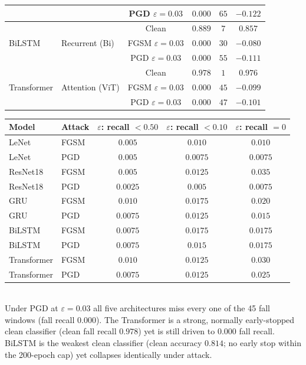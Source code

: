 \begin{table}[t]
\begin{tabular}{l l c c c c}
    & & PGD $\varepsilon{=}0.03$  & $0.000$ & $65$ & $-0.122$ \\
    \midrule
    \multirow{3}{*}{BiLSTM} & \multirow{3}{*}{Recurrent (Bi)}
      & Clean              & $0.889$ & $7$  & $0.857$ \\
    & & FGSM $\varepsilon{=}0.03$ & $0.000$ & $30$ & $-0.080$ \\
    & & PGD $\varepsilon{=}0.03$  & $0.000$ & $55$ & $-0.111$ \\
    \midrule
    \multirow{3}{*}{Transformer} & \multirow{3}{*}{Attention (ViT)}
      & Clean              & $0.978$ & $1$  & $0.976$ \\
    & & FGSM $\varepsilon{=}0.03$ & $0.000$ & $45$ & $-0.099$ \\
    & & PGD $\varepsilon{=}0.03$  & $0.000$ & $47$ & $-0.101$ \\
    \bottomrule
  \end{tabular}

  \vspace{0.6em}

  \begin{tabular}{l l c c c}
    \toprule
    Model & Attack & $\varepsilon$: recall $<0.50$ & $\varepsilon$: recall $<0.10$ & $\varepsilon$: recall $=0$ \\
    \midrule
    LeNet    & FGSM & $0.005$  & $0.010$  & $0.010$ \\
    LeNet    & PGD  & $0.005$  & $0.0075$ & $0.0075$ \\
    ResNet18 & FGSM & $0.005$  & $0.0125$ & $0.035$ \\
    ResNet18 & PGD  & $0.0025$ & $0.005$  & $0.0075$ \\
    GRU      & FGSM & $0.010$  & $0.0175$ & $0.020$ \\
    GRU      & PGD  & $0.0075$ & $0.0125$ & $0.015$ \\
    BiLSTM   & FGSM & $0.0075$ & $0.0175$ & $0.0175$ \\
    BiLSTM   & PGD  & $0.0075$ & $0.015$  & $0.0175$ \\
    Transformer & FGSM & $0.010$  & $0.0125$ & $0.030$ \\
    Transformer & PGD  & $0.0075$ & $0.0125$ & $0.025$ \\
    \bottomrule
  \end{tabular}
  \\[0.3em]
  {\footnotesize Under PGD at $\varepsilon=0.03$ all five architectures miss every
  one of the 45 fall windows (fall recall $0.000$). The Transformer is a strong,
  normally early-stopped clean classifier (clean fall recall $0.978$) yet is still
  driven to $0.000$ fall recall. BiLSTM is the weakest clean classifier (clean
  accuracy $0.814$; no early stop within the 200-epoch cap) yet collapses
  identically under attack.}
\end{table}
